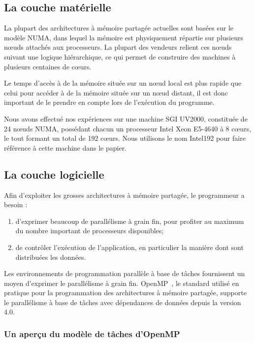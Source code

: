 \documentclass[parallelisme]{compas2016}
\begin{document}
\label{sec:background}
\subsection{La couche matérielle}
\label{sec:hardware}
La plupart des architectures à mémoire partagée actuelles sont basées sur le modèle NUMA,
dans lequel la mémoire est physiquement répartie sur plusieurs nœuds attachés
aux processeurs. La plupart des vendeurs relient ces nœuds suivant une logique
hiérarchique, ce qui permet de construire des machines à plusieurs centaines de cœurs.

Le temps d'accès à de la mémoire située sur un nœud local est plus rapide que celui
pour accéder à de la mémoire située sur un nœud distant, il est donc important
de le prendre en compte lors de l'exécution du programme.

Nous avons effectué nos expériences sur une machine SGI UV2000, constituée de
24 nœuds NUMA, possédant chacun un processeur Intel Xeon E5-4640 à 8 cœurs,
le tout formant un total de 192 cœurs. Nous utilisons le nom Intel192 pour faire
référence à cette machine dans le papier.

\subsection{La couche logicielle}

Afin d'exploiter les grosses architectures à mémoire partagée, le programmeur a besoin :
\begin{enumerate}
    \item d'exprimer beaucoup de parallélisme à grain fin, pour profiter au maximum du nombre
      important de processeurs disponibles;
    \item de contrôler l'exécution de l'application, en particulier la manière dont sont distribuées
      les données.
\end{enumerate}

Les environnements de programmation parallèle à base de tâches fournissent un moyen
d'exprimer le parallélisme à grain fin. OpenMP~\cite{openmp40}, le standard utilisé
en pratique pour la programmation des architectures à mémoire partagée, supporte
le parallélisme à base de tâches avec dépendances de données depuis la version 4.0.

\subsubsection{Un aperçu du modèle de tâches d'OpenMP}
\end{document}
